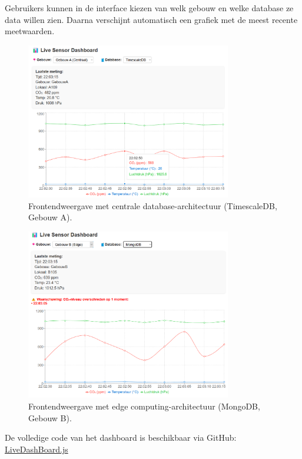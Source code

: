 Gebruikers kunnen in de interface kiezen van welk gebouw en welke database ze data willen zien. 
 Daarna verschijnt automatisch een grafiek met de meest recente meetwaarden.

\begin{figure}[H]
	\centering
	\includegraphics[width=0.8\textwidth]{GebouwA_TimeScale_Website.png}
	\caption{Frontendweergave met centrale database-architectuur (TimescaleDB, Gebouw A).}
    \label{fig:gebouw-a-architecture}
\end{figure}

\begin{figure}[H]
    \centering
    \includegraphics[width=0.8\textwidth]{GebouwB_MongoDb_Website.png}
    \caption{Frontendweergave met edge computing-architectuur (MongoDB, Gebouw B).}
    \label{fig:gebouw-b-architecture}
\end{figure}

De volledige code van het dashboard is beschikbaar via GitHub: \\
\href{https://github.com/WoutVC/bachelorproef2024/blob/main/proof_of_concept/frontend/src/components/LiveDashBoard.js}{LiveDashBoard.js}

